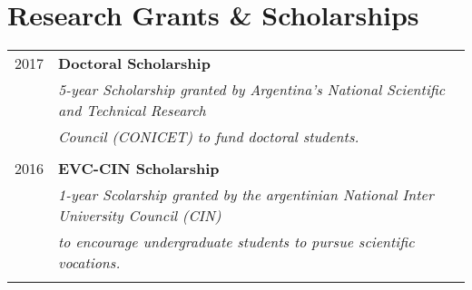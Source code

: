 \documentclass[a4paper,10pt]{article} %
\begin{document}
\section{Research Grants \& Scholarships}
\begin{longtable}{rl}

\textsc{2017} & \textbf{Doctoral Scholarship} \\ 
& \textit{5-year Scholarship granted by Argentina's National Scientific and Technical Research} \\
& \textit{Council (CONICET) to fund doctoral students.} \\ & \\

\textsc{2016} & \textbf{EVC-CIN Scholarship} \\ 
& \textit{1-year Scolarship granted by the argentinian National Inter University Council (CIN)} \\
& \textit{to encourage undergraduate students to pursue scientific vocations.} \\ & \\

\end{longtable}
\end{document}
